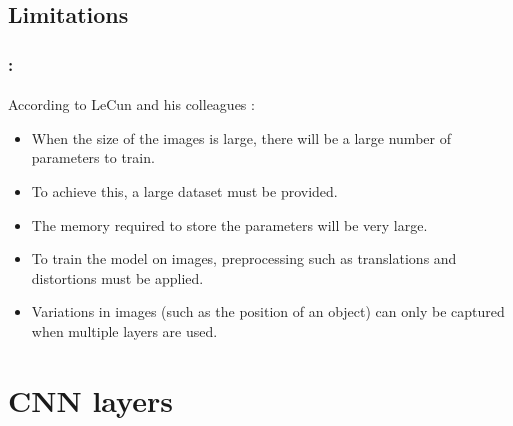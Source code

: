 \documentclass[xcolor=table]{beamer}
\begin{document}
\subsection{Limitations}

\begin{frame}
	\frametitle{\insertshortsubtitle: \insertsection}
	\framesubtitle{\insertsubsection}
	
	According to LeCun and his colleagues \cite{1998-lecun}:
	\begin{itemize}
		\item When the size of the images is large, there will be a large number of parameters to train.
		\item To achieve this, a large dataset must be provided.
		\item The memory required to store the parameters will be very large.
		\item To train the model on images, preprocessing such as translations and distortions must be applied.
		\item Variations in images (such as the position of an object) can only be captured when multiple layers are used.
	\end{itemize}

\end{frame}


\section{CNN layers}
\end{document}

